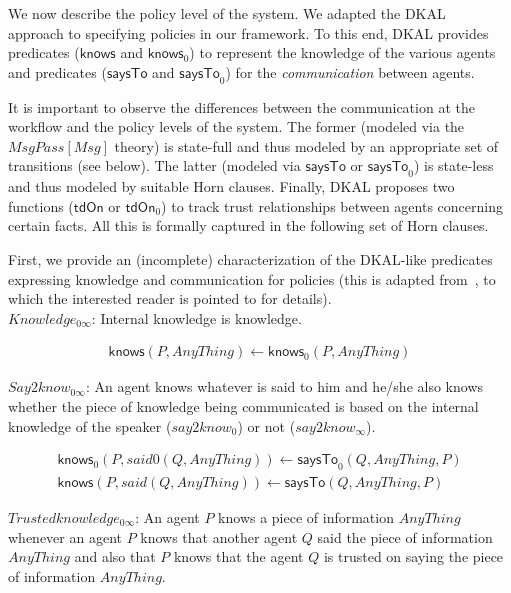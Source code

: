 \documentclass[conference]{IEEEtran}
\begin{document}
\begin{LONG}
We now describe the policy level of the system.  We adapted
the DKAL~\cite{DKAL-homepage} approach to specifying policies in our framework.  To
this end, DKAL provides predicates ($\mathsf{knows}$ and
$\mathsf{knows}_0$) to represent the knowledge of the various agents and
predicates ($\mathsf{saysTo}$ and $\mathsf{saysTo}_0$) for the
\emph{communication} between agents.\

It is important to observe the differences between the communication
at the workflow and the policy levels of the system. The former
(modeled via the $\mathit{MsgPass}[\mathit{Msg}]$ theory) is state-full
and thus modeled by an appropriate set of transitions (see below).
The latter (modeled via $\mathsf{saysTo}$ or $\mathsf{saysTo}_0$) is
state-less and thus modeled by suitable Horn clauses.  Finally, DKAL
proposes two functions ($\mathsf{tdOn}$ or $\mathsf{tdOn}_0$) to track
trust relationships between agents concerning certain facts.  All this
is formally captured in the following set of Horn clauses.

First, we provide an (incomplete) characterization of the DKAL-like predicates expressing
knowledge and communication for policies (this is adapted
from~\cite{DKAL-homepage}, to which the interested reader is pointed to for
details).  
\\

\noindent
$Knowledge_{0\infty}$: Internal knowledge is knowledge.
\begin{small}\begin{align*}
\mathsf{knows}(P,AnyThing) \leftarrow \mathsf{knows}_{0}(P,AnyThing) 
\end{align*}\end{small}

\noindent
$Say2know_{0\infty}$: An agent knows whatever is said to him and he/she also knows whether the piece 
of knowledge being communicated is based on the internal knowledge of the 
speaker ($say2know_0$) or not ($say2know_{\infty}$).

\begin{small}\begin{align*}
\mathsf{knows}_{0}(P,said0(Q,AnyThing)) \leftarrow \mathsf{saysTo}_{0}(Q,AnyThing,P)\\
\mathsf{knows}(P,said(Q,AnyThing)) \leftarrow \mathsf{saysTo}(Q,AnyThing,P)
\end{align*}\end{small}

\noindent
$Trustedknowledge_{0\infty}$: An agent $P$ knows a piece of information $AnyThing$ whenever 
an agent $P$ knows that another agent $Q$ said the piece of 
information $AnyThing$ and also that $P$ knows that the agent $Q$
is trusted on saying the piece of information $AnyThing$.\


\end{LONG}
\end{document}
